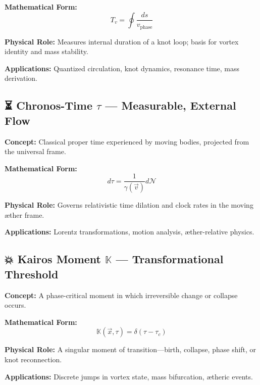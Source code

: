 \documentclass[a4paper,12pt]{article}
\begin{document}
    \textbf{Mathematical Form:}
    \[
        T_v = \oint \frac{ds}{v_{\text{phase}}}
    \]

    \textbf{Physical Role:} Measures internal duration of a knot loop; basis for vortex identity and mass stability.

    \textbf{Applications:} Quantized circulation, knot dynamics, resonance time, mass derivation.

    \subsection*{⏳ Chronos-Time $\tau$ — Measurable, External Flow}
    \textbf{Concept:} Classical proper time experienced by moving bodies, projected from the universal frame.

    \textbf{Mathematical Form:}
    \[
        d\tau = \frac{1}{\gamma(\vec{v})} d\mathcal{N}
    \]

    \textbf{Physical Role:} Governs relativistic time dilation and clock rates in the moving æther frame.

    \textbf{Applications:} Lorentz transformations, motion analysis, æther-relative physics.

    \subsection*{💥 Kairos Moment $\mathbb{K}$ — Transformational Threshold}
    \textbf{Concept:} A phase-critical moment in which irreversible change or collapse occurs.

    \textbf{Mathematical Form:}
    \[
        \mathbb{K}(\vec{x}, \tau) = \delta(\tau - \tau_c)
    \]

    \textbf{Physical Role:} A singular moment of transition—birth, collapse, phase shift, or knot reconnection.

    \textbf{Applications:} Discrete jumps in vortex state, mass bifurcation, ætheric events.
\end{document}
